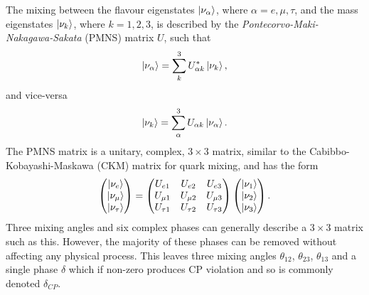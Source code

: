 The mixing between the flavour eigenstates $\ket{\nu_{\alpha}}$, where $\alpha=e,\mu,\tau$, and
the mass eigenstates $\ket{\nu_{k}}$, where $k=1,2,3$, is described by the
\emph{Pontecorvo-Maki-Nakagawa-Sakata} (PMNS) matrix $U$, such that
\begin{equation} %
    \ket{\nu_{\alpha}}=\sum_{k}^{3}U_{\alpha k}^{*}\ket{\nu_{k}},
\end{equation}
and vice-versa
\begin{equation} %
    \ket{\nu_{k}}=\sum_{\alpha}^{3}U_{\alpha k}\ket{\nu_{\alpha}}.
\end{equation}
The PMNS matrix is a unitary, complex, $3\times3$ matrix, similar to the Cabibbo-Kobayashi-Maskawa
(CKM) matrix for quark mixing, and has the form
\begin{gather} %
    \begin{pmatrix}
        \ket{\nu_{e}}   \\
        \ket{\nu_{\mu}} \\
        \ket{\nu_{\tau}}
    \end{pmatrix}
    =
    \begin{pmatrix}
        U_{e1}     & U_{e2}     & U_{e3}     \\
        U_{\mu 1}  & U_{\mu 2}  & U_{\mu 3}  \\
        U_{\tau 1} & U_{\tau 2} & U_{\tau 3}
    \end{pmatrix}
    \begin{pmatrix}
        \ket{\nu_{1}} \\
        \ket{\nu_{2}} \\
        \ket{\nu_{3}}
    \end{pmatrix}.
\end{gather} %
Three mixing angles and six complex phases can generally describe a $3\times3$ matrix such as
this. However, the majority of these phases can be removed without affecting any physical process.
This leaves three mixing angles $\theta_{12}$, $\theta_{23}$, $\theta_{13}$ and a single phase
$\delta$ which if non-zero produces CP violation and so is commonly denoted $\delta_{CP}$.

